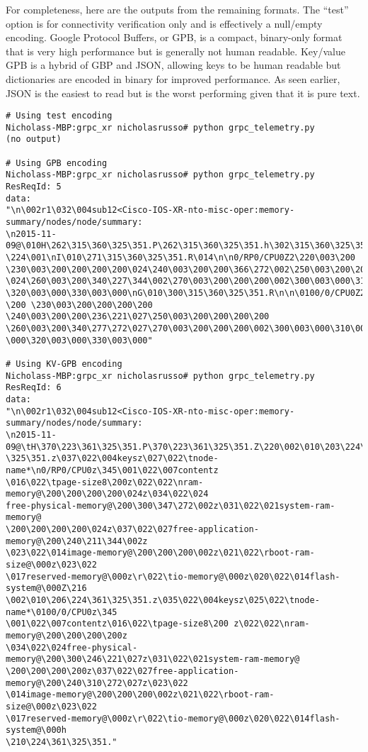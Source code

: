 For completeness, here are the outputs from the remaining formats. The ``test''
option is for connectivity verification only and is effectively a null/empty
encoding. Google Protocol Buffers, or GPB, is a compact, binary-only format
that is very high performance but is generally not human readable. Key/value
GPB is a hybrid of GBP and JSON, allowing keys to be human readable but
dictionaries are encoded in binary for improved performance. As seen earlier,
JSON is the easiest to read but is the worst performing given that it is
pure text.

\begin{verbatim}
# Using test encoding
Nicholass-MBP:grpc_xr nicholasrusso# python grpc_telemetry.py
(no output)

# Using GPB encoding
Nicholass-MBP:grpc_xr nicholasrusso# python grpc_telemetry.py
ResReqId: 5
data:
"\n\002r1\032\004sub12<Cisco-IOS-XR-nto-misc-oper:memory-summary/nodes/node/summary:
\n2015-11-09@\010H\262\315\360\325\351.P\262\315\360\325\351.h\302\315\360\325\351.b
\224\001\nI\010\271\315\360\325\351.R\014\n\n0/RP0/CPU0Z2\220\003\200 \230\003\200\200\200\200\024\240\003\200\200\366\272\002\250\003\200\200\200\200
\024\260\003\200\340\227\344\002\270\003\200\200\200\002\300\003\000\310\003\000
\320\003\000\330\003\000\nG\010\300\315\360\325\351.R\n\n\0100/0/CPU0Z2\220\003
\200 \230\003\200\200\200\200 \240\003\200\200\236\221\027\250\003\200\200\200\200 \260\003\200\340\277\272\027\270\003\200\200\200\002\300\003\000\310\003
\000\320\003\000\330\003\000"

# Using KV-GPB encoding
Nicholass-MBP:grpc_xr nicholasrusso# python grpc_telemetry.py
ResReqId: 6
data:
"\n\002r1\032\004sub12<Cisco-IOS-XR-nto-misc-oper:memory-summary/nodes/node/summary:
\n2015-11-09@\tH\370\223\361\325\351.P\370\223\361\325\351.Z\220\002\010\203\224\361
\325\351.z\037\022\004keysz\027\022\tnode-name*\n0/RP0/CPU0z\345\001\022\007contentz
\016\022\tpage-size8\200z\022\022\nram-memory@\200\200\200\200\024z\034\022\024
free-physical-memory@\200\300\347\272\002z\031\022\021system-ram-memory@
\200\200\200\200\024z\037\022\027free-application-memory@\200\240\211\344\002z
\023\022\014image-memory@\200\200\200\002z\021\022\rboot-ram-size@\000z\023\022
\017reserved-memory@\000z\r\022\tio-memory@\000z\020\022\014flash-system@\000Z\216
\002\010\206\224\361\325\351.z\035\022\004keysz\025\022\tnode-name*\0100/0/CPU0z\345
\001\022\007contentz\016\022\tpage-size8\200 z\022\022\nram-memory@\200\200\200\200z
\034\022\024free-physical-memory@\200\300\246\221\027z\031\022\021system-ram-memory@
\200\200\200\200z\037\022\027free-application-memory@\200\240\310\272\027z\023\022
\014image-memory@\200\200\200\002z\021\022\rboot-ram-size@\000z\023\022
\017reserved-memory@\000z\r\022\tio-memory@\000z\020\022\014flash-system@\000h
\210\224\361\325\351."
\end{verbatim}


